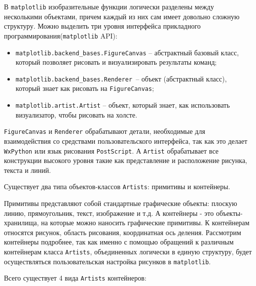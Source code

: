 В \lstinline!matplotlib! изобразительные функции логически разделены между несколькими объектами, причем каждый из них сам имеет довольно сложную структуру. Можно выделить три уровня интерфейса прикладного программирования(\lstinline!matplotlib! API):

\begin{itemize}
	\item  \lstinline!matplotlib.backend_bases.FigureCanvas! – абстрактный базовый класс, который позволяет рисовать и визуализировать результаты команд;
	\item  \lstinline!matplotlib.backend_bases.Renderer !– объект (абстрактный класс), который знает как рисовать на \lstinline!FigureCanvas!;
	\item  \lstinline!matplotlib.artist.Artist! – объект, который знает, как использовать визуализатор, чтобы рисовать на холсте.
\end{itemize}


\lstinline!FigureCanvas! и \lstinline!Renderer! обрабатывают детали, необходимые для взаимодействия со средствами пользовательского интерфейса, так как это делает \lstinline!WxPython! или язык рисования \lstinline!PostScript!. А \lstinline!Artist! обрабатывает все конструкции высокого уровня такие как представление и расположение рисунка, текста и линий.

Существует два типа объектов-классов \lstinline!Artists!: примитивы и контейнеры.

Примитивы представляют собой стандартные графические объекты: плоскую линию, прямоугольник, текст, изображение и т.д. А контейнеры - это объекты-хранилища, на которые можно наносить графические примитивы. К контейнерам относятся рисунок, область рисования, координатная ось деления. Рассмотрим контейнеры подробнее, так как именно с помощью обращений к различным контейнерам класса \lstinline!Artists!, объединенных логически в единую структуру, будет осуществляться пользовательская настройка рисунков в \lstinline!matplotlib!.

Всего существует 4 вида \lstinline!Artists! контейнеров:

